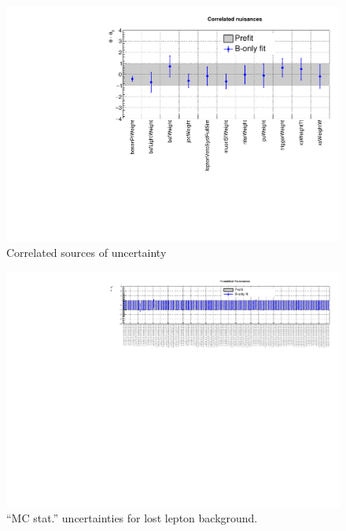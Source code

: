 \begin{figure}[h!]
  \centering
  \caption{Correlated sources of uncertainty}
  \includegraphics[width=1.\linewidth]{figures/results/36invfb_preapproval/postfit/nuis/Correlated_nuisances}
\end{figure}

\clearpage
\begin{figure}[h!]
  \centering
  \caption{``MC stat.'' uncertainties for lost lepton background.}
  \includegraphics[width=1.\linewidth]{figures/results/36invfb_preapproval/postfit/nuis/FormulaSystTtw_nuisances}
\end{figure}

